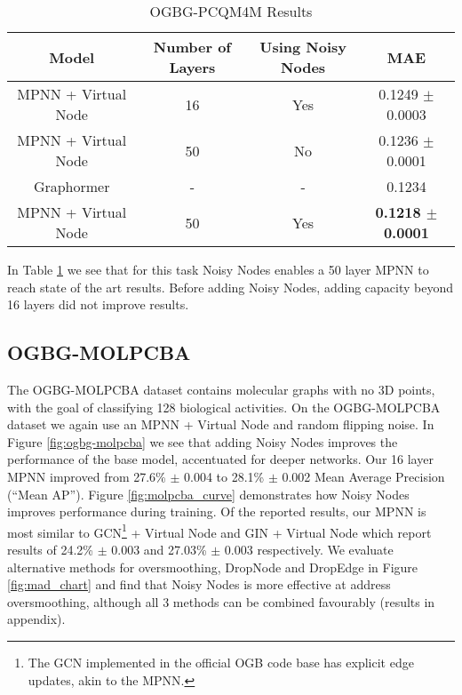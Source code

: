 \documentclass{article} \usepackage{iclr2022_conference,times}
\begin{document}
\begin{table}[]
    \centering
    \caption{OGBG-PCQM4M Results}
    \begin{tabular}{cccc}
    \toprule
         Model & Number of Layers & Using Noisy Nodes & MAE  \\
     \midrule
         MPNN + Virtual Node & 16 & Yes & 0.1249 $\pm$ 0.0003 \\
         MPNN + Virtual Node & 50 & No & 0.1236 $\pm$ 0.0001 \\
         Graphormer \citep{Ying2021DoTR} & - & - & 0.1234 \\
         MPNN + Virtual Node & 50 & Yes & 	\textbf{0.1218 $\pm$ 0.0001} \\
     \bottomrule
    \end{tabular}
    
    \label{tab:pcqm4m}
\end{table}

In Table \ref{tab:pcqm4m} we see that for this task Noisy Nodes enables a 50 layer MPNN to reach state of the art results. Before adding Noisy Nodes, adding capacity beyond 16 layers did not improve results.

\subsection{OGBG-MOLPCBA}

The OGBG-MOLPCBA dataset contains molecular graphs with no 3D points, with the goal of classifying 128 biological activities. On the OGBG-MOLPCBA dataset we again use an MPNN + Virtual Node and random flipping noise. In Figure \ref{fig:ogbg-molpcba} we see that adding Noisy Nodes improves the performance of the base model, accentuated for deeper networks. Our 16 layer MPNN improved from 27.6\% $\pm$ 0.004 to 28.1\% $\pm$ 0.002 Mean Average Precision (``Mean AP''). Figure \ref{fig:molpcba_curve} demonstrates how Noisy Nodes improves performance during training. Of the reported results, our MPNN is most similar to GCN\footnote{The GCN implemented in the official OGB code base has explicit edge updates, akin to the MPNN.} + Virtual Node and GIN + Virtual Node \citep{Xu2018Gin} which report results of 24.2\% $\pm$ 0.003 and 27.03\% $\pm$ 0.003 respectively. We evaluate alternative methods for oversmoothing, DropNode  and DropEdge in Figure \ref{fig:mad_chart} and find that Noisy Nodes is more effective at address oversmoothing, although all 3 methods can be combined favourably (results in appendix).
\end{document}
